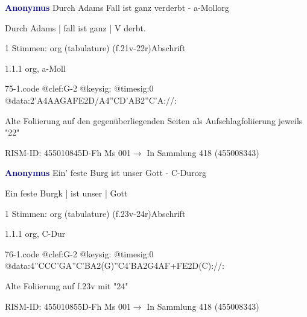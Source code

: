 \documentclass[twocolumn]{book}
\begin{document}
\par \vspace{7pt} \textcolor{darkblue}{\textbf{Anonymus  }}\hfillplus{\textbf{[75]}}\newline Durch Adams Fall ist ganz verderbt - a-Moll\newline org
\par \begin{itshape}[f.21v, at left:] Durch Adams | fall ist ganz | V derbt.\end{itshape} 
\par \textcolor{darkblue}{}  1 Stimmen: org (tabulature)  (f.21v-22r)\newline Abschrift
\par 1.1.1  org, a-Moll  
\begin{filecontents*}{75-1.code}
@clef:G-2
@keysig:
@timesig:0
@data:2'A4AAGAFE2D/A4''CD'AB2''C'A://:
\end{filecontents*}
\newline
%
\par Alte Foliierung auf den gegenüberliegenden Seiten als Aufschlagfoliierung jeweils "22"
\par RISM-ID: 455010845\newline D-Fh  Ms 001\newline $\rightarrow$ In Sammlung 418 (455008343)
      
\par \vspace{7pt} \textcolor{darkblue}{\textbf{Anonymus  }}\hfillplus{\textbf{[76]}}\newline Ein' feste Burg ist unser Gott - C-Dur\newline org
\par \begin{itshape}[f.24r, at left:] Ein feste Burgk | ist unser | Gott\end{itshape} 
\par \textcolor{darkblue}{}  1 Stimmen: org (tabulature)  (f.23v-24r)\newline Abschrift
\par 1.1.1  org, C-Dur  
\begin{filecontents*}{76-1.code}
@clef:G-2
@keysig:
@timesig:0
@data:4''CCC'GA''C'BA2(G)''C4'BA2G4AF+FE2D(C)://:
\end{filecontents*}
\newline
%
\par Alte Foliierung auf f.23v mit "24"
\par RISM-ID: 455010855\newline D-Fh  Ms 001\newline $\rightarrow$ In Sammlung 418 (455008343)
      
\end{document}
